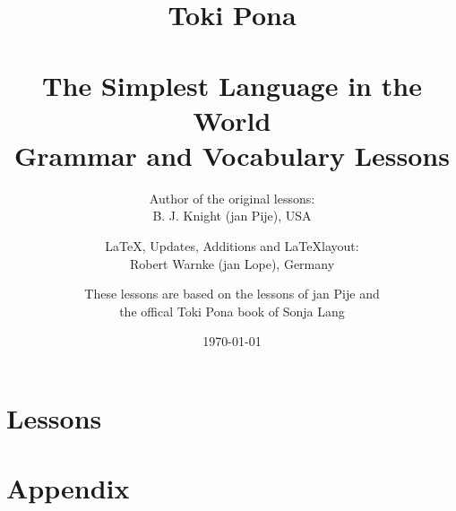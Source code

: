 \documentclass[a4paper, 10pt]{book}
\begin{document}
\setlength{\topmargin}{-19mm}
\setlength{\headheight}{5mm}
\setlength{\headsep}{10mm}
\setlength{\textheight}{245mm}
\setlength{\textwidth}{155mm}
\setlength{\oddsidemargin}{5mm}
\setlength{\evensidemargin}{-1mm}
\setlength{\footskip}{20mm}
\setlength{\parindent}{0mm}
\setlength{\parskip}{2.0ex plus 1.0ex minus 0.5ex}
\batchmode
\title{
Toki Pona \\  \\ 
The Simplest Language in the World \\ 
Grammar and Vocabulary Lessons \\
}
\author{
Author of the original lessons: \\ B. J. Knight (jan Pije), USA \cite{www:Pije:01} \\  
\and
\LaTeX, Updates, Additions and \LaTeX layout: \\ Robert Warnke (jan Lope), Germany \cite{www:rowa:01} \\ 
\and
These lessons are based on the lessons of jan Pije and \\ 
the offical Toki Pona book of Sonja Lang \cite{www:tokipona.org} 
}

%
\date
\today
\maketitle
\tableofcontents
%
\chapter{Lessons}




















%


%
\appendix
\chapter{Appendix}
%
%







%


\printindex
\end{document}
